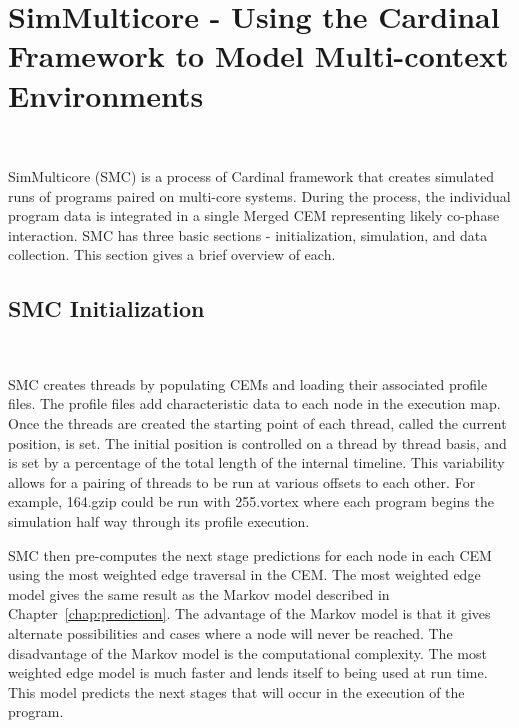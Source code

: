 \section{SimMulticore - Using the Cardinal Framework to Model Multi-context
Environments}~\label{sec:simmc_construction}

SimMulticore (SMC) is a process of Cardinal framework that creates
simulated runs of programs paired on multi-core systems.  During
the process, the individual program data is integrated in a single
Merged CEM representing likely co-phase interaction.  SMC has three
basic sections - initialization, simulation, and data collection.
This section gives a brief overview of each.

\subsection{SMC Initialization}~\label{sec:simmc_init}

SMC creates threads by populating CEMs and loading their associated
profile files.  The profile files add characteristic data to each node
in the execution map.  Once the threads are created
the starting point of each thread,
called the current position, is set. The initial position is
controlled on a thread by thread basis, and is set by a percentage of
the total length of the internal timeline. This variability allows for
a pairing of threads to be run at various offsets to each other. For
example, 164.gzip could be run with 255.vortex where each program
begins the simulation half way through its profile execution.

SMC then pre-computes the next stage predictions for each node in each
CEM using the most weighted edge traversal in the CEM. 
The most weighted edge model gives the same result as the Markov model described
in Chapter~\ref{chap:prediction}. The advantage of the Markov model is that it
gives alternate possibilities and cases where a node will never be reached. The
disadvantage of the Markov model is the computational complexity. The most
weighted edge model is much faster and lends itself to being used at run time.
This model predicts the next stages that will occur in the execution of the program.

